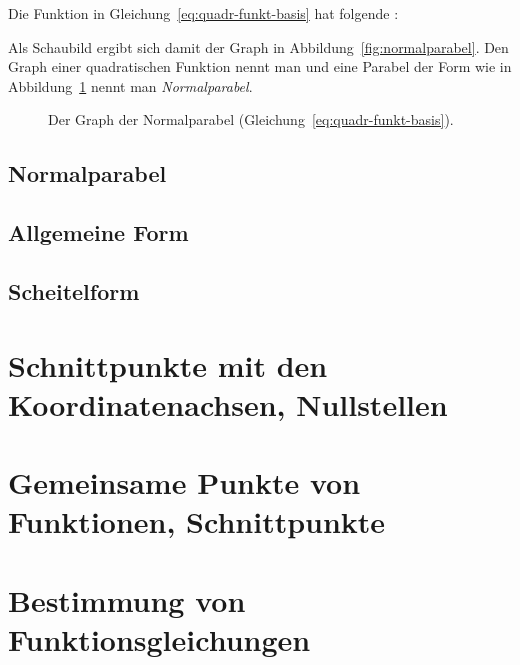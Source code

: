 \documentclass[loadfonts,babel=ngerman]{arbeitsblatt}
\begin{document}
Die Funktion in Gleichung~\vref{eq:quadr-funkt-basis} hat folgende
:

\begin{center}
\end{center}

Als Schaubild ergibt sich damit der Graph in
Abbildung~\vref{fig:normalparabel}.  Den Graph einer quadratischen Funktion
nennt man  und eine Parabel der Form wie in
Abbildung~\ref{fig:normalparabel} nennt man \emph{Normalparabel}.

\begin{figure}
  \centering
  \caption{Der Graph der Normalparabel
    (Gleichung~\ref{eq:quadr-funkt-basis}).}
  \label{fig:normalparabel}
\end{figure}

\subsection{Normalparabel}

\subsection{Allgemeine Form}

\subsection{Scheitelform}

\section{Schnittpunkte mit den Koordinatenachsen, Nullstellen}

\section{Gemeinsame Punkte von Funktionen, Schnittpunkte}

\section{Bestimmung von Funktionsgleichungen}

\printacronyms
\end{document}
